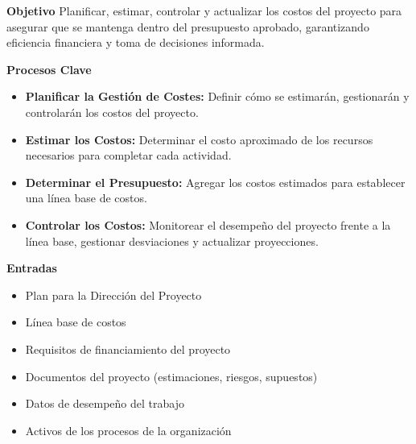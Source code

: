       \begin{multicols}{2}
        \textbf{Objetivo}
        Planificar, estimar, controlar y actualizar los costos del proyecto para asegurar que se mantenga dentro del presupuesto aprobado, garantizando eficiencia financiera y toma de decisiones informada.

        \textbf{Procesos Clave}
        \begin{itemize}
            \item \textbf{Planificar la Gestión de Costes:} Definir cómo se estimarán, gestionarán y controlarán los costos del proyecto.
            \item \textbf{Estimar los Costos:} Determinar el costo aproximado de los recursos necesarios para completar cada actividad.
            \item \textbf{Determinar el Presupuesto:} Agregar los costos estimados para establecer una línea base de costos.
            \item \textbf{Controlar los Costos:} Monitorear el desempeño del proyecto frente a la línea base, gestionar desviaciones y actualizar proyecciones.
        \end{itemize}

        \textbf{Entradas}
        \begin{itemize}
            \item Plan para la Dirección del Proyecto
            \item Línea base de costos
            \item Requisitos de financiamiento del proyecto
            \item Documentos del proyecto (estimaciones, riesgos, supuestos)
            \item Datos de desempeño del trabajo
            \item Activos de los procesos de la organización
        \end{itemize}


\end{multicols}
